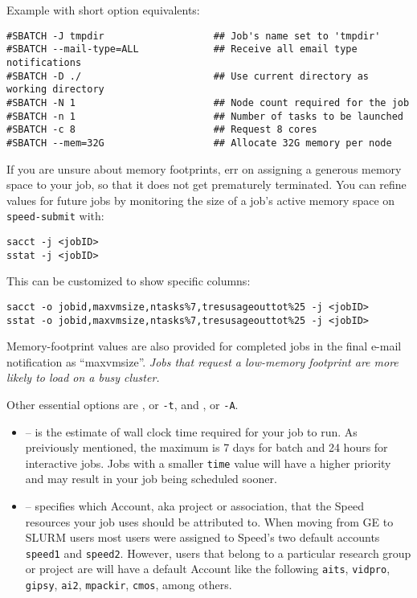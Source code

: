 Example with short option equivalents:

\begin{verbatim}
#SBATCH -J tmpdir                   ## Job's name set to 'tmpdir'
#SBATCH --mail-type=ALL             ## Receive all email type notifications
#SBATCH -D ./                       ## Use current directory as working directory
#SBATCH -N 1                        ## Node count required for the job
#SBATCH -n 1                        ## Number of tasks to be launched
#SBATCH -c 8                        ## Request 8 cores
#SBATCH --mem=32G                   ## Allocate 32G memory per node 
\end{verbatim}

%
If you are unsure about memory footprints, err on assigning a generous
memory space to your job, so that it does not get prematurely terminated.
You can refine
values for future jobs by monitoring the size of a job's active
memory space on \texttt{speed-submit} with:


\begin{verbatim}
sacct -j <jobID>
sstat -j <jobID>
\end{verbatim}

\noindent
This can be customized to show specific columns:

\begin{verbatim}
sacct -o jobid,maxvmsize,ntasks%7,tresusageouttot%25 -j <jobID>
sstat -o jobid,maxvmsize,ntasks%7,tresusageouttot%25 -j <jobID>
\end{verbatim}

Memory-footprint values are also provided for completed jobs in the final
e-mail notification as ``maxvmsize''.
%
\emph{Jobs that request a low-memory footprint are more likely to load on a busy
cluster.}

Other essential options are , or \verb|-t|, and , or \verb|-A|.
%
\begin{itemize}
\item
{} -- is the estimate of wall clock time required for your job to run. 
As preiviously mentioned, the maximum is 7 days for batch and 24 hours for interactive jobs. 
Jobs with a smaller \texttt{time} value will have a higher priority and may result in your job being scheduled sooner. 

\item
{} -- specifies which Account, aka project or association, 
that the Speed resources your job uses should be attributed to. When moving from 
GE to SLURM users most users were assigned to Speed's two default accounts 
\texttt{speed1} and \texttt{speed2}. However, users that belong to a particular research
group or project are will have a default Account like the following
\texttt{aits},
\texttt{vidpro},
\texttt{gipsy},
\texttt{ai2},
\texttt{mpackir},
\texttt{cmos}, among others.

\end{itemize}